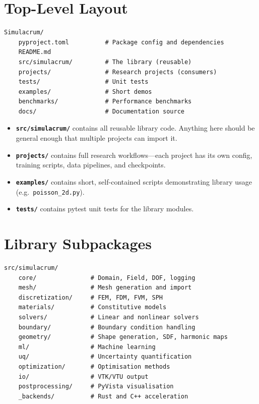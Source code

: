 \documentclass[11pt,a4paper]{report}
\begin{document}
\section{Top-Level Layout}

\begin{lstlisting}[style=bash,numbers=none]
Simulacrum/
    pyproject.toml          # Package config and dependencies
    README.md
    src/simulacrum/         # The library (reusable)
    projects/               # Research projects (consumers)
    tests/                  # Unit tests
    examples/               # Short demos
    benchmarks/             # Performance benchmarks
    docs/                   # Documentation source
\end{lstlisting}

\begin{itemize}[leftmargin=2em]
    \item \textbf{\texttt{src/simulacrum/}} contains all reusable library code. Anything here should be general enough that multiple projects can import it.
    \item \textbf{\texttt{projects/}} contains full research workflows---each project has its own config, training scripts, data pipelines, and checkpoints.
    \item \textbf{\texttt{examples/}} contains short, self-contained scripts demonstrating library usage (e.g.\ \texttt{poisson\_2d.py}).
    \item \textbf{\texttt{tests/}} contains pytest unit tests for the library modules.
\end{itemize}

\section{Library Subpackages}

\begin{lstlisting}[style=bash,numbers=none]
src/simulacrum/
    core/               # Domain, Field, DOF, logging
    mesh/               # Mesh generation and import
    discretization/     # FEM, FDM, FVM, SPH
    materials/          # Constitutive models
    solvers/            # Linear and nonlinear solvers
    boundary/           # Boundary condition handling
    geometry/           # Shape generation, SDF, harmonic maps
    ml/                 # Machine learning
    uq/                 # Uncertainty quantification
    optimization/       # Optimisation methods
    io/                 # VTK/VTU output
    postprocessing/     # PyVista visualisation
    _backends/          # Rust and C++ acceleration
\end{lstlisting}
\end{document}
